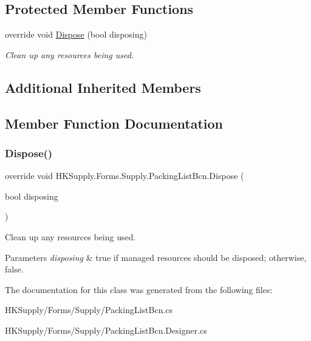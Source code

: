 \subsection*{Protected Member Functions}
\begin{DoxyCompactItemize}
\item 
override void \mbox{\hyperlink{class_h_k_supply_1_1_forms_1_1_supply_1_1_packing_list_bcn_ae90d2b4a6343ac59fe3ab76e1b705cf8}{Dispose}} (bool disposing)
\begin{DoxyCompactList}\small\item\em Clean up any resources being used. \end{DoxyCompactList}\end{DoxyCompactItemize}
\subsection*{Additional Inherited Members}


\subsection{Member Function Documentation}
\mbox{\label{class_h_k_supply_1_1_forms_1_1_supply_1_1_packing_list_bcn_ae90d2b4a6343ac59fe3ab76e1b705cf8}} 
\subsubsection{\texorpdfstring{Dispose()}{Dispose()}}
{\footnotesize\ttfamily override void H\+K\+Supply.\+Forms.\+Supply.\+Packing\+List\+Bcn.\+Dispose (\begin{DoxyParamCaption}\item[{bool}]{disposing }\end{DoxyParamCaption})\hspace{0.3cm}{\ttfamily [protected]}}



Clean up any resources being used. 


\begin{DoxyParams}{Parameters}
{\em disposing} & true if managed resources should be disposed; otherwise, false.\\
\hline
\end{DoxyParams}


The documentation for this class was generated from the following files\+:\begin{DoxyCompactItemize}
\item 
H\+K\+Supply/\+Forms/\+Supply/Packing\+List\+Bcn.\+cs\item 
H\+K\+Supply/\+Forms/\+Supply/Packing\+List\+Bcn.\+Designer.\+cs\end{DoxyCompactItemize}
